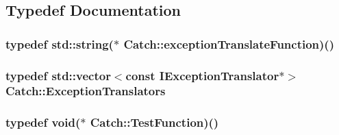\subsection{Typedef Documentation}
\hypertarget{namespaceCatch_ae1727c8cadfc5ad8b43dff651cd2f8b0}{
\subsubsection[{exception\-Translate\-Function}]{\setlength{\rightskip}{0pt plus 5cm}typedef std\-::string($\ast$ Catch\-::exception\-Translate\-Function)()}}\label{namespaceCatch_ae1727c8cadfc5ad8b43dff651cd2f8b0}
\hypertarget{namespaceCatch_ae0442a3627f91437716106138b5f540b}{
\subsubsection[{Exception\-Translators}]{\setlength{\rightskip}{0pt plus 5cm}typedef std\-::vector$<$const {\bf I\-Exception\-Translator}$\ast$$>$ {\bf Catch\-::\-Exception\-Translators}}}\label{namespaceCatch_ae0442a3627f91437716106138b5f540b}
\hypertarget{namespaceCatch_a768da872b9033e4c71c6f316393d35db}{
\subsubsection[{Test\-Function}]{\setlength{\rightskip}{0pt plus 5cm}typedef void($\ast$ Catch\-::\-Test\-Function)()}}\label{namespaceCatch_a768da872b9033e4c71c6f316393d35db}


